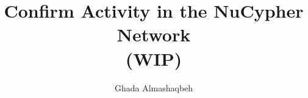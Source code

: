 \documentclass{llncs}
\begin{document}
\title{\Large \bf Confirm Activity in the NuCypher Network \\
(WIP)}
\author{Ghada Almashaqbeh}

\date{} %



\maketitle









\end{document}
